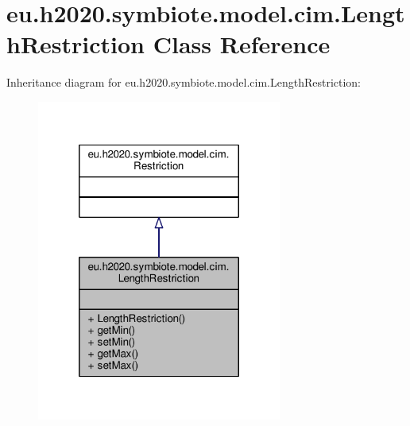 \hypertarget{classeu_1_1h2020_1_1symbiote_1_1model_1_1cim_1_1LengthRestriction}{}\section{eu.\+h2020.\+symbiote.\+model.\+cim.\+Length\+Restriction Class Reference}
\label{classeu_1_1h2020_1_1symbiote_1_1model_1_1cim_1_1LengthRestriction}


Inheritance diagram for eu.\+h2020.\+symbiote.\+model.\+cim.\+Length\+Restriction\+:\nopagebreak
\begin{figure}[H]
\begin{center}
\leavevmode
\includegraphics[width=228pt]{classeu_1_1h2020_1_1symbiote_1_1model_1_1cim_1_1LengthRestriction__inherit__graph}
\end{center}
\end{figure}


